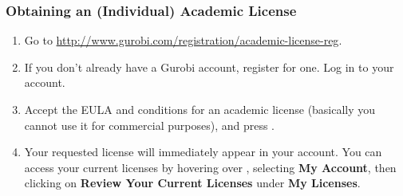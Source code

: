 \documentclass[12pt]{article}
\begin{document}
\subsubsection{Obtaining an (Individual) Academic License}
\begin{enumerate}
    \item Go to \url{http://www.gurobi.com/registration/academic-license-reg}.
    \item If you don't already have a Gurobi account, register for one.
        Log in to your account.
    \item Accept the EULA and conditions for an academic license (basically you cannot use it for commercial purposes), and press .
    \item Your requested license will immediately appear in your account.
        You can access your current licenses by hovering over , selecting \textbf{My Account}, then clicking on \textbf{Review Your Current Licenses} under \textbf{My Licenses}.
\end{enumerate}
\end{document}
